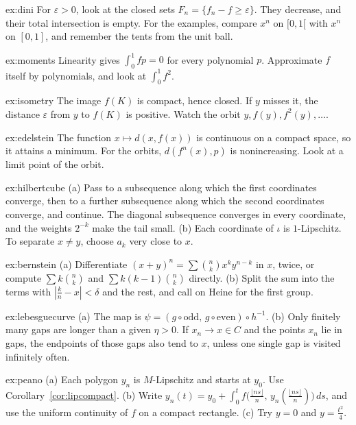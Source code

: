 \begin{hint}{ex:dini}
For $\varepsilon>0$, look at the closed sets $F_n=\{f_n-f\ge\varepsilon\}$. They decrease, and their total intersection is empty. For the examples, compare $x^n$ on $[0,1[$ with $x^n$ on $[0,1]$, and remember the tents from the unit ball.
\end{hint}
\begin{hint}{ex:moments}
Linearity gives $\int_0^1 fp=0$ for every polynomial $p$. Approximate $f$ itself by polynomials, and look at $\int_0^1 f^2$.
\end{hint}
\begin{hint}{ex:isometry}
The image $f(K)$ is compact, hence closed. If $y$ misses it, the distance $\varepsilon$ from $y$ to $f(K)$ is positive. Watch the orbit $y,f(y),f^2(y),\dots$.
\end{hint}
\begin{hint}{ex:edelstein}
The function $x\mapsto d(x,f(x))$ is continuous on a compact space, so it attains a minimum. For the orbits, $d(f^n(x),p)$ is nonincreasing. Look at a limit point of the orbit.
\end{hint}
\begin{hint}{ex:hilbertcube}
(a) Pass to a subsequence along which the first coordinates converge, then to a further subsequence along which the second coordinates converge, and continue. The diagonal subsequence converges in every coordinate, and the weights $2^{-k}$ make the tail small. (b) Each coordinate of $\iota$ is $1$-Lipschitz. To separate $x\ne y$, choose $a_k$ very close to $x$.
\end{hint}
\begin{hint}{ex:bernstein}
(a) Differentiate $(x+y)^n=\sum\binom nkx^ky^{n-k}$ in $x$, twice, or compute $\sum k\binom nk$ and $\sum k(k-1)\binom nk$ directly. (b) Split the sum into the terms with $|\frac kn-x|<\delta$ and the rest, and call on Heine for the first group.
\end{hint}
\begin{hint}{ex:lebesguecurve}
(a) The map is $\psi=(g\circ\mathrm{odd},\,g\circ\mathrm{even})\circ h^{-1}$. (b) Only finitely many gaps are longer than a given $\eta>0$. If $x_n\to x\in C$ and the points $x_n$ lie in gaps, the endpoints of those gaps also tend to $x$, unless one single gap is visited infinitely often.
\end{hint}
\begin{hint}{ex:peano}
(a) Each polygon $y_n$ is $M$-Lipschitz and starts at $y_0$. Use Corollary~\ref{cor:lipcompact}. (b) Write $y_n(t)=y_0+\int_0^t f\bigl(\frac{\lfloor ns\rfloor}n,\,y_n(\frac{\lfloor ns\rfloor}n)\bigr)\,ds$, and use the uniform continuity of $f$ on a compact rectangle. (c) Try $y=0$ and $y=\frac{t^2}4$.
\end{hint}
